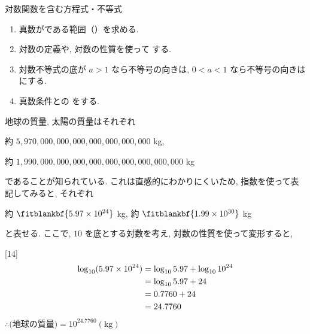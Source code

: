 \documentclass[14pt,dvipdfmx]{jsarticle}
\begin{document}

\vspace{-1.6zw}
\vspace{-0.35em}
\begin{reviewbox}{対数関数を含む方程式・不等式}
  \begin{enumerate}[label=\textbf{\arabic*}, leftmargin=1.5zw, itemsep=0.02em]
    \item 真数がである範囲（）を求める.
    \item 対数の定義や, 対数の性質を使って する.
    \item 対数不等式の底が $a>1$ なら不等号の向きは,
    $0<a<1$ なら不等号の向きはにする.
    \item 真数条件との をする.
  \end{enumerate}
\end{reviewbox}

\vspace{0.25em}
地球の質量, 太陽の質量はそれぞれ
\par\vspace{0.2em}
{\centering
約 $5,970,000,000,000,000,000,000,000$ kg,

約 $1,990,000,000,000,000,000,000,000,000,000$ kg
\par}
であることが知られている. これは直感的にわかりにくいため, 指数を使って表記してみると, それぞれ

\par\vspace{0.2em}
{\centering
約 $\fitblankbf{5.97 \times 10^{24}}$ kg, \quad
約 $\fitblankbf{1.99 \times 10^{30}}$ kg
\par}

と表せる. ここで, $10$ を底とする対数を考え, 対数の性質を使って変形すると,
\vspace{0.2em}
\begin{answerbox}{}[14]
\begin{align*}
  \vspace{-0.5em}
  \log_{10} (5.97 \times 10^{24})
  &= \log_{10} 5.97 + \log_{10} 10^{24} \\
  &= \log_{10} 5.97 + 24 \\
  &= 0.7760 + 24 \\
  &= 24.7760
\end{align*}
$\therefore \text{(地球の質量)} = 10^{24.7760}(\text{kg})$
\end{answerbox}
\end{document}
